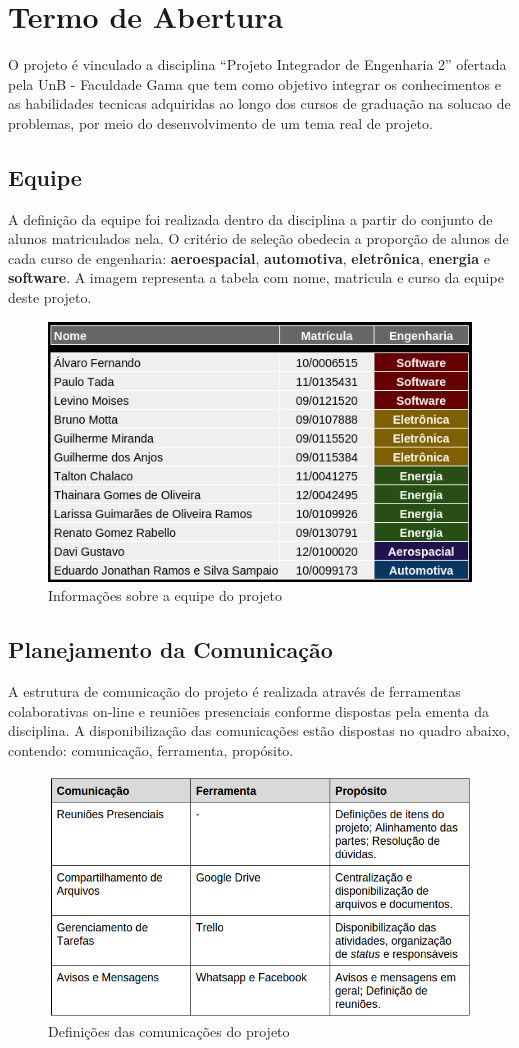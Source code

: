 \section{Termo de Abertura}
O projeto é vinculado a disciplina “Projeto Integrador de Engenharia 2” ofertada pela UnB - Faculdade Gama que tem como objetivo integrar os conhecimentos e as habilidades tecnicas adquiridas ao longo dos cursos de graduação na solucao de problemas, por meio do desenvolvimento de um tema real de projeto.

\subsection{Equipe}

A definição da equipe foi realizada dentro da disciplina a partir do conjunto de alunos matriculados nela. O critério de seleção obedecia a proporção de alunos de cada curso de engenharia: \textbf{aeroespacial}, \textbf{automotiva}, \textbf{eletrônica}, \textbf{energia} e \textbf{software}. A imagem representa a tabela com nome, matricula e curso da equipe deste projeto.

\begin{figure}[H]
  \centering
  \includegraphics[width=.6\textwidth]{edit/img/equipe.png}
  \caption{Informações sobre a equipe do projeto}
  \label{equipe}
\end{figure}

\subsection{Planejamento da Comunicação}
A estrutura de comunicação do projeto é realizada através de ferramentas colaborativas on-line e reuniões presenciais conforme dispostas pela ementa da disciplina. A disponibilização das comunicações estão dispostas no quadro abaixo, contendo: comunicação, ferramenta, propósito.

\begin{figure}[H]
  \centering
  \includegraphics[width=.7\textwidth]{edit/img/comunicacao.png}
  \caption{Definições das comunicações do projeto}
  \label{comunicacao}
\end{figure}
